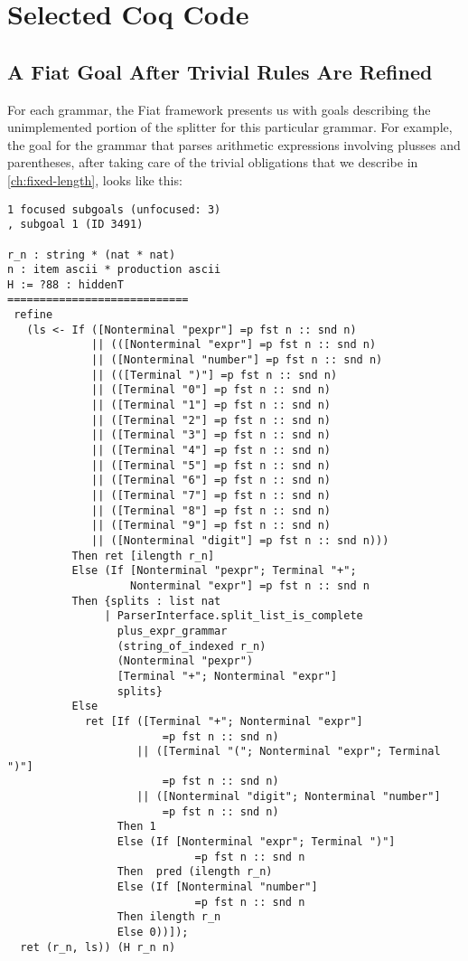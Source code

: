\chapter{Selected Coq Code}
  \section{A Fiat Goal After Trivial Rules Are Refined}
      For each grammar, the Fiat framework presents us with goals describing the unimplemented portion of the splitter for this particular grammar.  For example, the goal for the grammar that parses arithmetic expressions involving plusses and parentheses, after taking care of the trivial obligations that we describe in \autoref{ch:fixed-length}, looks like this:\label{sec:after-if-folding-num-+-paren}
\begin{verbatim}
1 focused subgoals (unfocused: 3)
, subgoal 1 (ID 3491)
  
r_n : string * (nat * nat)
n : item ascii * production ascii
H := ?88 : hiddenT
============================
 refine
   (ls <- If ([Nonterminal "pexpr"] =p fst n :: snd n)
             || (([Nonterminal "expr"] =p fst n :: snd n)
             || ([Nonterminal "number"] =p fst n :: snd n)
             || (([Terminal ")"] =p fst n :: snd n)
             || ([Terminal "0"] =p fst n :: snd n)
             || ([Terminal "1"] =p fst n :: snd n)
             || ([Terminal "2"] =p fst n :: snd n)
             || ([Terminal "3"] =p fst n :: snd n)
             || ([Terminal "4"] =p fst n :: snd n)
             || ([Terminal "5"] =p fst n :: snd n)
             || ([Terminal "6"] =p fst n :: snd n)
             || ([Terminal "7"] =p fst n :: snd n)
             || ([Terminal "8"] =p fst n :: snd n)
             || ([Terminal "9"] =p fst n :: snd n)
             || ([Nonterminal "digit"] =p fst n :: snd n)))
          Then ret [ilength r_n]
          Else (If [Nonterminal "pexpr"; Terminal "+";
                   Nonterminal "expr"] =p fst n :: snd n
          Then {splits : list nat
               | ParserInterface.split_list_is_complete
                 plus_expr_grammar
                 (string_of_indexed r_n)
                 (Nonterminal "pexpr")
                 [Terminal "+"; Nonterminal "expr"]
                 splits}
          Else
            ret [If ([Terminal "+"; Nonterminal "expr"]
                        =p fst n :: snd n)
                    || ([Terminal "("; Nonterminal "expr"; Terminal ")"]
                        =p fst n :: snd n)
                    || ([Nonterminal "digit"; Nonterminal "number"]
                        =p fst n :: snd n)
                 Then 1
                 Else (If [Nonterminal "expr"; Terminal ")"]
                             =p fst n :: snd n 
                 Then  pred (ilength r_n)
                 Else (If [Nonterminal "number"]
                             =p fst n :: snd n 
                 Then ilength r_n
                 Else 0))]);
  ret (r_n, ls)) (H r_n n)
\end{verbatim}

